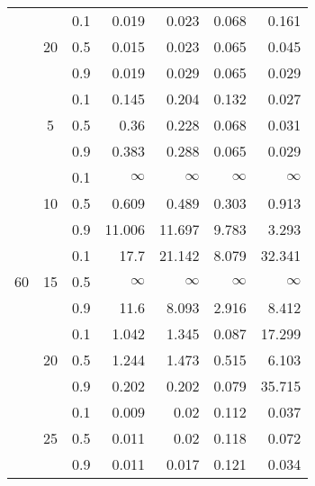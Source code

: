 \begin{table}
\begin{tabular}{|c|c|c|rrrr|}
 & \multirow{3}{*}{20} & 0.1 & 0.019 & 0.023 & 0.068 & 0.161 \\
 &  & 0.5 & 0.015 & 0.023 & 0.065 & 0.045 \\
 &  & 0.9 & 0.019 & 0.029 & 0.065 & 0.029 \\ \hline
 \multirow{15}{*}{60} & 
 \multirow{3}{*}{5} & 0.1 & 0.145 & 0.204 & 0.132 & 0.027 \\
 &  & 0.5 & 0.36 & 0.228 & 0.068 & 0.031 \\
 &  & 0.9 & 0.383 & 0.288 & 0.065 & 0.029 \\ \cline{2-7} 
 & \multirow{3}{*}{10} & 0.1 & $\infty$ & $\infty$ & $\infty$ & $\infty$ \\
 &  & 0.5 & 0.609 & 0.489 & 0.303 & 0.913 \\
 &  & 0.9 & 11.006 & 11.697 & 9.783 & 3.293 \\ \cline{2-7} 
 & \multirow{3}{*}{15} & 0.1 & 17.7 & 21.142 & 8.079 & 32.341 \\
 &  & 0.5 &  $\infty$ & $\infty$ & $\infty$ & $\infty$ \\
 &  & 0.9 & 11.6 & 8.093 & 2.916 & 8.412  \\ \cline{2-7} 
 & \multirow{3}{*}{20} & 0.1 & 1.042 & 1.345 & 0.087 & 17.299 \\
 &  & 0.5 & 1.244 & 1.473 & 0.515 & 6.103 \\
 &  & 0.9 & 0.202 & 0.202 & 0.079 & 35.715 \\ \cline{2-7}
 & \multirow{3}{*}{25} & 0.1 & 0.009 & 0.02 & 0.112 & 0.037 \\
 &  & 0.5 & 0.011 & 0.02 & 0.118 & 0.072 \\
 &  & 0.9 & 0.011 & 0.017 & 0.121 & 0.034 \\ \hline
\end{tabular}
\end{table}